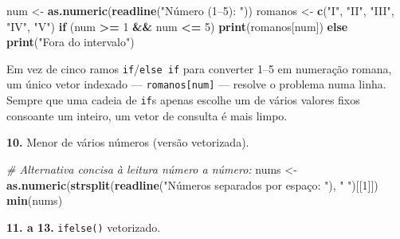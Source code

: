 \documentclass[
  portuguese,
  11pt,
  openany]{book}
\newenvironment{Shaded}{\begin{snugshade}}{\end{snugshade}}
\newcommand{\CommentTok}[1]{\textcolor[rgb]{0.56,0.35,0.01}{\textit{#1}}}
\newcommand{\ControlFlowTok}[1]{\textcolor[rgb]{0.13,0.29,0.53}{\textbf{#1}}}
\newcommand{\DecValTok}[1]{\textcolor[rgb]{0.00,0.00,0.81}{#1}}
\newcommand{\FunctionTok}[1]{\textcolor[rgb]{0.13,0.29,0.53}{\textbf{#1}}}
\newcommand{\NormalTok}[1]{#1}
\newcommand{\OtherTok}[1]{\textcolor[rgb]{0.56,0.35,0.01}{#1}}
\newcommand{\SpecialCharTok}[1]{\textcolor[rgb]{0.81,0.36,0.00}{\textbf{#1}}}
\newcommand{\StringTok}[1]{\textcolor[rgb]{0.31,0.60,0.02}{#1}}
\begin{document}
\begin{Shaded}
\begin{Highlighting}[]
\NormalTok{num }\OtherTok{\textless{}{-}} \FunctionTok{as.numeric}\NormalTok{(}\FunctionTok{readline}\NormalTok{(}\StringTok{"Número (1–5): "}\NormalTok{))}
\NormalTok{romanos }\OtherTok{\textless{}{-}} \FunctionTok{c}\NormalTok{(}\StringTok{"I"}\NormalTok{, }\StringTok{"II"}\NormalTok{, }\StringTok{"III"}\NormalTok{, }\StringTok{"IV"}\NormalTok{, }\StringTok{"V"}\NormalTok{)}
\ControlFlowTok{if}\NormalTok{ (num }\SpecialCharTok{\textgreater{}=} \DecValTok{1} \SpecialCharTok{\&\&}\NormalTok{ num }\SpecialCharTok{\textless{}=} \DecValTok{5}\NormalTok{) }\FunctionTok{print}\NormalTok{(romanos[num]) }\ControlFlowTok{else} \FunctionTok{print}\NormalTok{(}\StringTok{"Fora do intervalo"}\NormalTok{)}
\end{Highlighting}
\end{Shaded}

Em vez de cinco ramos \texttt{if}/\texttt{else\ if} para converter 1--5 em numeração romana,
um único vetor indexado --- \texttt{romanos{[}num{]}} --- resolve o problema numa linha. Sempre
que uma cadeia de \texttt{if}s apenas escolhe um de vários valores fixos consoante um
inteiro, um vetor de consulta é mais limpo.

\textbf{10.} Menor de vários números (versão vetorizada).

\begin{Shaded}
\begin{Highlighting}[]
\CommentTok{\# Alternativa concisa à leitura número a número:}
\NormalTok{nums }\OtherTok{\textless{}{-}} \FunctionTok{as.numeric}\NormalTok{(}\FunctionTok{strsplit}\NormalTok{(}\FunctionTok{readline}\NormalTok{(}\StringTok{"Números separados por espaço: "}\NormalTok{), }\StringTok{" "}\NormalTok{)[[}\DecValTok{1}\NormalTok{]])}
\FunctionTok{min}\NormalTok{(nums)}
\end{Highlighting}
\end{Shaded}

\textbf{11. a 13.} \texttt{ifelse()} vetorizado.
\end{document}

